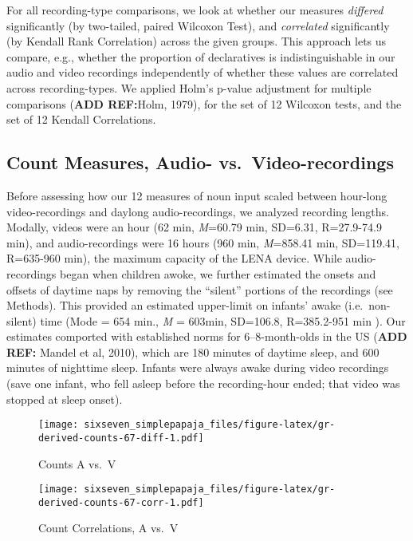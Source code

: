 \documentclass[floatsintext,man]{apa6}
\theoremstyle{definition}
\theoremstyle{definition}
\theoremstyle{definition}
\theoremstyle{remark}
\begin{document}
For all recording-type comparisons, we look at whether our measures
\emph{differed} significantly (by two-tailed, paired Wilcoxon Test), and
\emph{correlated} significantly (by Kendall Rank Correlation) across the
given groups. This approach lets us compare, e.g., whether the
proportion of declaratives is indistinguishable in our audio and video
recordings independently of whether these values are correlated across
recording-types. We applied Holm's p-value adjustment for multiple
comparisons (\textbf{ADD REF:}Holm, 1979), for the set of 12 Wilcoxon
tests, and the set of 12 Kendall Correlations.

\hypertarget{count-measures-audio--vs.video-recordings}{%
\subsection{Count Measures, Audio-
vs.~Video-recordings}\label{count-measures-audio--vs.video-recordings}}

Before assessing how our 12 measures of noun input scaled between
hour-long video-recordings and daylong audio-recordings, we analyzed
recording lengths. Modally, videos were an hour (62 min, \emph{M}=60.79
min, SD=6.31, R=27.9-74.9 min), and audio-recordings were 16 hours (960
min, \emph{M}=858.41 min, SD=119.41, R=635-960 min), the maximum
capacity of the LENA device. While audio-recordings began when children
awoke, we further estimated the onsets and offsets of daytime naps by
removing the \enquote{silent} portions of the recordings (see Methods).
This provided an estimated upper-limit on infants' awake
(i.e.~non-silent) time (Mode = 654 min., \emph{M} = 603min, SD=106.8,
R=385.2-951 min ). Our estimates comported with established norms for
6--8-month-olds in the US (\textbf{ADD REF:} Mandel et al, 2010), which
are 180 minutes of daytime sleep, and 600 minutes of nighttime sleep.
Infants were always awake during video recordings (save one infant, who
fell asleep before the recording-hour ended; that video was stopped at
sleep onset).

\begin{figure}
\centering
\texttt{[image: sixseven\_simplepapaja\_files/figure-latex/gr-derived-counts-67-diff-1.pdf]}
\caption{\label{fig:gr-derived-counts-67-diff}Counts A vs.~V}
\end{figure}

\begin{figure}
\centering
\texttt{[image: sixseven\_simplepapaja\_files/figure-latex/gr-derived-counts-67-corr-1.pdf]}
\caption{\label{fig:gr-derived-counts-67-corr}Count Correlations, A vs.~V}
\end{figure}
\end{document}
